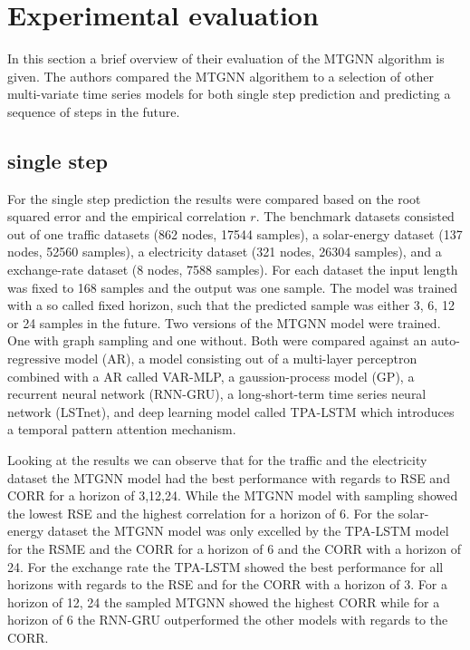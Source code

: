 \documentclass[letterpaper,twocolumn,11pt]{article}
\begin{document}
    \section{Experimental evaluation}
    In this section a brief overview of their evaluation of the MTGNN algorithm is given.
    The authors compared the MTGNN algorithem to a selection of other multi-variate time series models for both single step prediction and predicting a sequence of steps in the future.

    \subsection{single step}
    For the single step prediction the results were compared based on the root squared error
    and the empirical correlation $r$.
    The benchmark datasets consisted out of
    one traffic datasets (862 nodes, 17544 samples),
    a solar-energy dataset (137 nodes, 52560 samples),
    a electricity dataset (321 nodes, 26304 samples),
    and a exchange-rate dataset (8 nodes, 7588 samples).
    For each dataset the input length was fixed to 168 samples and the output was one sample.
    The model was trained with a so called fixed horizon, such that the predicted sample was either 3, 6, 12 or 24 samples in the future.
    Two versions of the MTGNN model were trained.
    One with graph sampling and one without.
    Both were compared against an
    auto-regressive model (AR),
    a model consisting out of a multi-layer perceptron combined with a AR called VAR-MLP,
    a gaussion-process model (GP),
    a recurrent neural network (RNN-GRU),
    a long-short-term time series neural network (LSTnet),
    and deep learning model called TPA-LSTM which introduces a temporal pattern attention mechanism.

    Looking at the results we can observe that for the traffic and the electricity dataset the MTGNN model had the best performance with regards to RSE and CORR for a horizon of 3,12,24.
    While the MTGNN model with sampling showed the lowest RSE and the highest correlation for a horizon of 6.
    For the solar-energy dataset the MTGNN model was only excelled by the TPA-LSTM model for the RSME and the CORR for a horizon of 6 and the CORR with a horizon of 24.
    For the exchange rate the TPA-LSTM showed the best performance for all horizons with regards to the RSE and for the CORR with a horizon of 3.
    For a horizon of 12, 24 the sampled MTGNN showed the highest CORR while for a horizon of 6 the RNN-GRU outperformed the other models with regards to the CORR.
\end{document}
